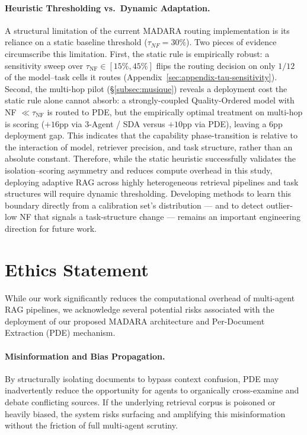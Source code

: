 \documentclass[11pt]{article}
\theoremstyle{definition}
\begin{document}
\paragraph{Heuristic Thresholding vs.\ Dynamic Adaptation.}
A structural limitation of the current MADARA routing implementation is its reliance on a static baseline threshold (\(\tau_{NF} = 30\%\)). Two pieces of evidence circumscribe this limitation. First, the static rule is empirically robust: a sensitivity sweep over \(\tau_{\text{NF}}\in[15\%,45\%]\) flips the routing decision on only \(1/12\) of the model--task cells it routes (Appendix~\ref{sec:appendix-tau-sensitivity}). Second, the multi-hop pilot (\S\ref{subsec:musique}) reveals a deployment cost the static rule alone cannot absorb: a strongly-coupled Quality-Ordered model with NF \(\ll \tau_{\text{NF}}\) is routed to PDE, but the empirically optimal treatment on multi-hop is scoring (\(+16\)pp via 3-Agent / SDA versus \(+10\)pp via PDE), leaving a 6pp deployment gap. This indicates that the capability phase-transition is relative to the interaction of model, retriever precision, and task structure, rather than an absolute constant. Therefore, while the static heuristic successfully validates the isolation--scoring asymmetry and reduces compute overhead in this study, deploying adaptive RAG across highly heterogeneous retrieval pipelines and task structures will require dynamic thresholding. Developing methods to learn this boundary directly from a calibration set's distribution --- and to detect outlier-low NF that signals a task-structure change --- remains an important engineering direction for future work.


\section*{Ethics Statement}

While our work significantly reduces the computational overhead of multi-agent RAG pipelines, we acknowledge several potential risks associated with the deployment of our proposed MADARA architecture and Per-Document Extraction (PDE) mechanism.

\paragraph{Misinformation and Bias Propagation.} 
By structurally isolating documents to bypass context confusion, PDE may inadvertently reduce the opportunity for agents to organically cross-examine and debate conflicting sources. If the underlying retrieval corpus is poisoned or heavily biased, the system risks surfacing and amplifying this misinformation without the friction of full multi-agent scrutiny.
\end{document}
